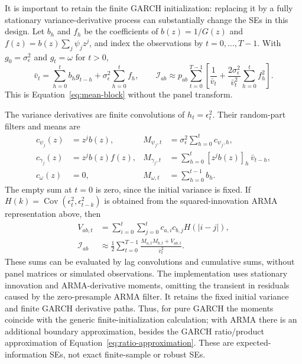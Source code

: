 \documentclass[12pt]{article}
\begin{document}
It is important to retain the finite GARCH initialization: replacing it by a fully stationary variance-derivative process can substantially change the SEs in this design. Let $b_h$ and $f_h$ be the coefficients of
$b(z)=1/G(z)$ and $f(z)=b(z)\sum_j\psi_jz^j$, and index the observations by $t=0,\ldots,T-1$. With $g_0=\sigma_\epsilon^2$ and $g_t=\omega$ for $t>0$,
\begin{equation}
\bar v_t=\sum_{h=0}^t b_hg_{t-h}+\sigma_\epsilon^2\sum_{h=0}^t f_h,\qquad
\mathcal I_{ab}\approx p_{ab}\sum_{t=0}^{T-1}
\left[\frac1{\bar v_t}+
\frac{2\sigma_\epsilon^2}{\bar v_t^2}\sum_{h=0}^t f_h^2\right].
\label{eq:df-time-mean-information}
\end{equation}
This is Equation~\ref{eq:mean-block} without the panel transform.

The variance derivatives are finite convolutions of $h_t=\epsilon_t^2$. Their random-part filters and means are
\begin{equation}
\begin{aligned}
c_{\psi_j}(z)&=z^jb(z),&
M_{\psi_j,t}&=\sigma_\epsilon^2\sum_{h=0}^t c_{\psi_j,h},\\
c_{\gamma_j}(z)&=z^jb(z)f(z),&
M_{\gamma_j,t}&=\sum_{h=0}^t [z^jb(z)]_h\,\bar v_{t-h},\\
c_\omega(z)&=0,&
M_{\omega,t}&=\sum_{h=0}^{t-1}b_h .
\end{aligned}
\label{eq:df-time-derivatives}
\end{equation}
The empty sum at $t=0$ is zero, since the initial variance is fixed. If
$H(k)=\operatorname{Cov}(\epsilon_t^2,\epsilon_{t-k}^2)$ is obtained from the squared-innovation ARMA representation above, then
\begin{equation}
\begin{aligned}
V_{ab,t}&=\sum_{i=0}^t\sum_{j=0}^t c_{a,i}c_{b,j}H(|i-j|),\\
\mathcal I_{ab}&\approx\frac12\sum_{t=0}^{T-1}
\frac{M_{a,t}M_{b,t}+V_{ab,t}}{\bar v_t^2}.
\end{aligned}
\label{eq:df-time-variance-information}
\end{equation}
These sums can be evaluated by lag convolutions and cumulative sums, without panel matrices or simulated observations.
The implementation uses stationary innovation and ARMA-derivative moments, omitting the transient in residuals caused by the zero-presample ARMA filter. It retains the fixed initial variance and finite GARCH derivative paths. Thus, for pure GARCH the moments coincide with the generic finite-initialization calculation; with ARMA there is an additional boundary approximation, besides the GARCH ratio/product approximation of Equation~\ref{eq:ratio-approximation}. These are expected-information SEs, not exact finite-sample or robust SEs.
\end{document}
